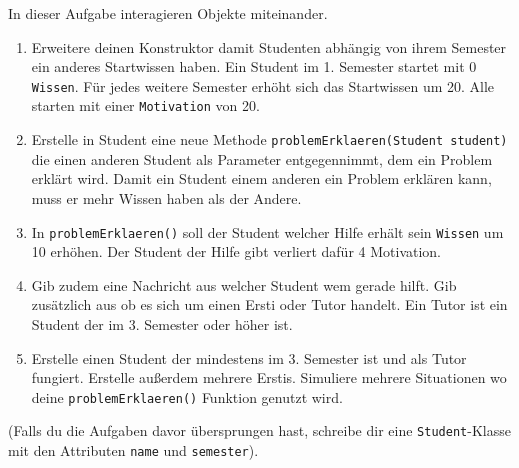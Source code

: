 \documentclass{../../sheet}
\begin{document}
In dieser Aufgabe interagieren Objekte miteinander.
\begin{enumerate}
    \item Erweitere deinen Konstruktor damit Studenten abhängig von ihrem Semester ein anderes Startwissen haben. Ein Student im 1. Semester startet mit 0 \texttt{Wissen}. Für jedes weitere Semester erhöht sich das Startwissen um 20. Alle starten mit einer \texttt{Motivation} von 20.
    \item Erstelle in Student eine neue Methode \texttt{problemErklaeren(Student student)} die einen anderen Student als Parameter entgegennimmt, dem ein Problem erklärt wird. Damit ein Student einem anderen ein Problem erklären kann, muss er mehr Wissen haben als der Andere.
    \item In \texttt{problemErklaeren()} soll der Student welcher Hilfe erhält sein \texttt{Wissen} um 10 erhöhen. Der Student der Hilfe gibt verliert dafür 4 Motivation.
    \item Gib zudem eine Nachricht aus welcher Student wem gerade hilft. Gib zusätzlich aus ob es sich um einen Ersti oder Tutor handelt. Ein Tutor ist ein Student der im 3. Semester oder höher ist.
    \item Erstelle einen Student der mindestens im 3. Semester ist und als Tutor fungiert. Erstelle außerdem mehrere Erstis. Simuliere mehrere Situationen wo deine \texttt{problemErklaeren()} Funktion genutzt wird.
\end{enumerate}

\newpage
{}
(Falls du die Aufgaben davor übersprungen hast, schreibe dir  eine \texttt{Student}-Klasse mit den Attributen \texttt{name} und \texttt{semester}).
\end{document}
